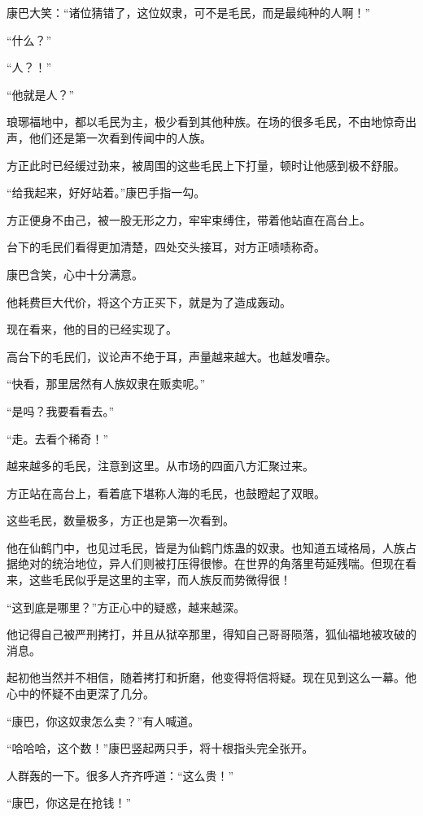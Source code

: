 \begin{this_body}
康巴大笑：“诸位猜错了，这位奴隶，可不是毛民，而是最纯种的人啊！”

“什么？”

“人？！”

“他就是人？”

琅琊福地中，都以毛民为主，极少看到其他种族。在场的很多毛民，不由地惊奇出声，他们还是第一次看到传闻中的人族。

方正此时已经缓过劲来，被周围的这些毛民上下打量，顿时让他感到极不舒服。

“给我起来，好好站着。”康巴手指一勾。

方正便身不由己，被一股无形之力，牢牢束缚住，带着他站直在高台上。

台下的毛民们看得更加清楚，四处交头接耳，对方正啧啧称奇。

康巴含笑，心中十分满意。

他耗费巨大代价，将这个方正买下，就是为了造成轰动。

现在看来，他的目的已经实现了。

高台下的毛民们，议论声不绝于耳，声量越来越大。也越发嘈杂。

“快看，那里居然有人族奴隶在贩卖呢。”

“是吗？我要看看去。”

“走。去看个稀奇！”

越来越多的毛民，注意到这里。从市场的四面八方汇聚过来。

方正站在高台上，看着底下堪称人海的毛民，也鼓瞪起了双眼。

这些毛民，数量极多，方正也是第一次看到。

他在仙鹤门中，也见过毛民，皆是为仙鹤门炼蛊的奴隶。也知道五域格局，人族占据绝对的统治地位，异人们则被打压得很惨。在世界的角落里苟延残喘。但现在看来，这些毛民似乎是这里的主宰，而人族反而势微得很！

“这到底是哪里？”方正心中的疑惑，越来越深。

他记得自己被严刑拷打，并且从狱卒那里，得知自己哥哥陨落，狐仙福地被攻破的消息。

起初他当然并不相信，随着拷打和折磨，他变得将信将疑。现在见到这么一幕。他心中的怀疑不由更深了几分。

“康巴，你这奴隶怎么卖？”有人喊道。

“哈哈哈，这个数！”康巴竖起两只手，将十根指头完全张开。

人群轰的一下。很多人齐齐呼道：“这么贵！”

“康巴，你这是在抢钱！”


\end{this_body}
